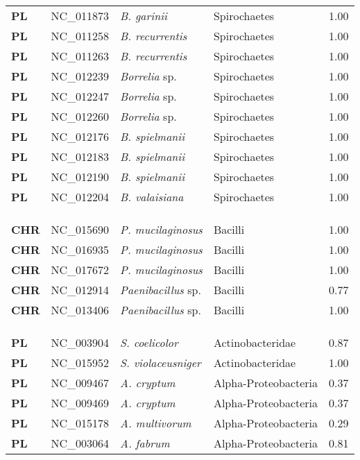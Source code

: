 \begin{adjustwidth}{-3cm}{2cm}
{\begin{supertabular}{>{\bfseries}l|p{0.1\textwidth}p{0.14\textwidth}l|l}
PL & NC\_011873 & \textit{B. garinii} &  Spirochaetes & 1.00\\
PL & NC\_011258 & \textit{B. recurrentis} &  Spirochaetes & 1.00\\
PL & NC\_011263 & \textit{B. recurrentis} &  Spirochaetes & 1.00\\
PL & NC\_012239 & \textit{Borrelia} sp. &  Spirochaetes & 1.00\\
PL & NC\_012247 & \textit{Borrelia} sp. &  Spirochaetes & 1.00\\
PL & NC\_012260 & \textit{Borrelia} sp. &  Spirochaetes & 1.00\\
PL & NC\_012176 & \textit{B. spielmanii} &  Spirochaetes & 1.00\\
PL & NC\_012183 & \textit{B. spielmanii} &  Spirochaetes & 1.00\\
PL & NC\_012190 & \textit{B. spielmanii} &  Spirochaetes & 1.00\\
PL & NC\_012204 & \textit{B. valaisiana} &  Spirochaetes & 1.00\\
\\
\\
\hline\\
CHR & NC\_015690 & \textit{P. mucilaginosus} & Bacilli & 1.00\\
CHR & NC\_016935 & \textit{P. mucilaginosus} & Bacilli & 1.00\\
CHR & NC\_017672 & \textit{P. mucilaginosus} & Bacilli & 1.00\\
CHR & NC\_012914 & \textit{Paenibacillus} sp. & Bacilli & 0.77\\
CHR & NC\_013406 & \textit{Paenibacillus} sp. & Bacilli & 1.00\\
\\
\\
\hline\\
PL & NC\_003904 & \textit{S. coelicolor} & Actinobacteridae & 0.87\\
PL & NC\_015952 & \textit{S. violaceusniger} & Actinobacteridae & 1.00\\
PL & NC\_009467 & \textit{A. cryptum} & Alpha-Proteobacteria & 0.37\\
PL & NC\_009469 & \textit{A. cryptum} & Alpha-Proteobacteria & 0.37\\
PL & NC\_015178 & \textit{A. multivorum} & Alpha-Proteobacteria & 0.29\\
PL & NC\_003064 & \textit{A. fabrum} & Alpha-Proteobacteria & 0.81\\

\end{supertabular}}
\end{adjustwidth}
